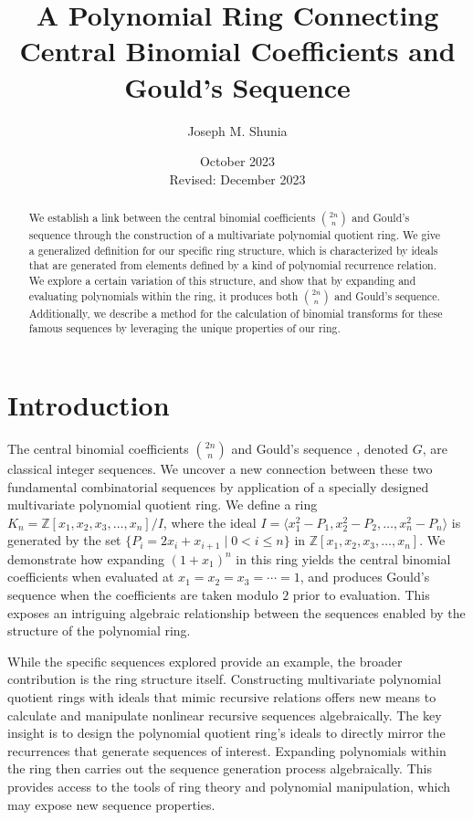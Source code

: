 \documentclass{article}
\theoremstyle{plain}
\theoremstyle{definition}
\newcommand{\Z}{\mathbb{Z}}
\newcommand{\K}{K}
\begin{document}
\title{A Polynomial Ring Connecting Central Binomial Coefficients and Gould's Sequence}
\author{Joseph M. Shunia}
\date{October 2023 \\ \small Revised: December 2023 \normalsize}
\maketitle

\begin{abstract}
We establish a link between the central binomial coefficients $\binom{2n}{n}$ and Gould's sequence through the construction of a multivariate polynomial quotient ring. We give a generalized definition for our specific ring structure, which is characterized by ideals that are generated from elements defined by a kind of polynomial recurrence relation. We explore a certain variation of this structure, and show that by expanding and evaluating  polynomials within the ring, it produces both $\binom{2n}{n}$ and Gould's sequence. Additionally, we describe a method for the calculation of binomial transforms for these famous sequences by leveraging the unique properties of our ring.
\end{abstract}

\section{Introduction}
The central binomial coefficients $\binom{2n}{n}$ \cite{A000984} and Gould's sequence \cite{A001316}, denoted $G$, are classical integer sequences. We uncover a new connection between these two fundamental combinatorial sequences by application of a specially designed multivariate polynomial quotient ring. We define a ring $\K_n = \Z[x_1, x_2, x_3, \ldots, x_n]/I$, where the ideal $I = \langle x_1^2 - P_1, x_2^2 - P_2, \ldots, x_n^2 - P_n \rangle$ is generated by the set $\{P_i = 2x_i + x_{i+1} \mid 0 < i \leq n \}$ in $\Z[x_1, x_2, x_3, \ldots, x_n]$. We demonstrate how expanding $(1 + x_1)^n$ in this ring yields the central binomial coefficients when evaluated at $x_1=x_2=x_3=\cdots=1$, and produces Gould's sequence when the coefficients are taken modulo $2$ prior to evaluation. This exposes an intriguing algebraic relationship between the sequences enabled by the structure of the polynomial ring.

While the specific sequences explored provide an example, the broader contribution is the ring structure itself. Constructing multivariate polynomial quotient rings with ideals that mimic recursive relations offers new means to calculate and manipulate nonlinear recursive sequences algebraically. The key insight is to design the polynomial quotient ring's ideals to directly mirror the recurrences that generate sequences of interest. Expanding polynomials within the ring then carries out the sequence generation process algebraically. This provides access to the tools of ring theory and polynomial manipulation, which may expose new sequence properties.
\end{document}
